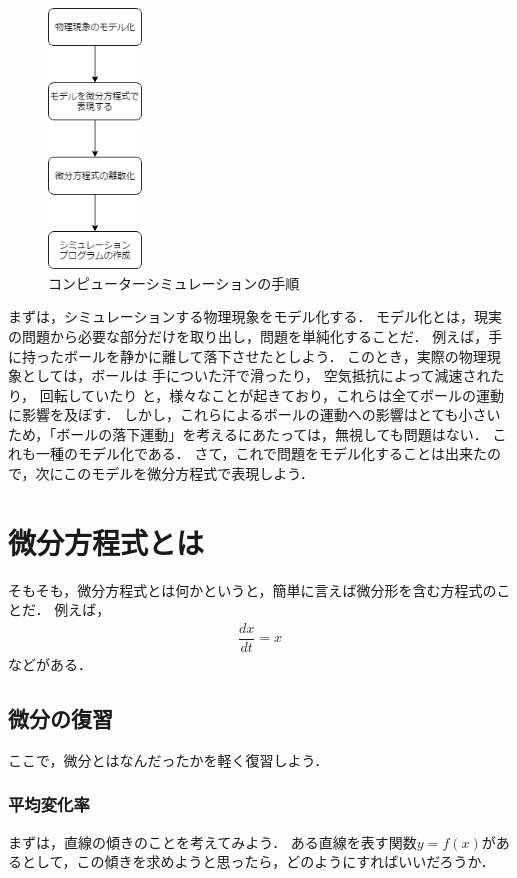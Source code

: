 \begin{figure}
	\centering
    \includegraphics[width=2.5cm]{img/numerical-analysis-flow.png}
    \caption{コンピューターシミュレーションの手順}
    \label{numerical-analysis-flow}
\end{figure}


まずは，シミュレーションする物理現象をモデル化する．
モデル化とは，現実の問題から必要な部分だけを取り出し，問題を単純化することだ．
例えば，手に持ったボールを静かに離して落下させたとしよう．
このとき，実際の物理現象としては，ボールは
手についた汗で滑ったり，
空気抵抗によって減速されたり，
回転していたり
と，様々なことが起きており，これらは全てボールの運動に影響を及ぼす．
しかし，これらによるボールの運動への影響はとても小さいため，「ボールの落下運動」を考えるにあたっては，無視しても問題はない．
これも一種のモデル化である．
さて，これで問題をモデル化することは出来たので，次にこのモデルを微分方程式で表現しよう．

\section{微分方程式とは}
そもそも，微分方程式とは何かというと，簡単に言えば微分形を含む方程式のことだ．
例えば，
\begin{align}
	\dfrac{dx}{dt} = x
\end{align}
などがある．

\subsection{微分の復習}
ここで，微分とはなんだったかを軽く復習しよう．
\subsubsection{平均変化率\label{section-average-rate-of-change}}
まずは，直線の傾きのことを考えてみよう．
ある直線を表す関数$y=f(x)$があるとして，この傾きを求めようと思ったら，どのようにすればいいだろうか．

